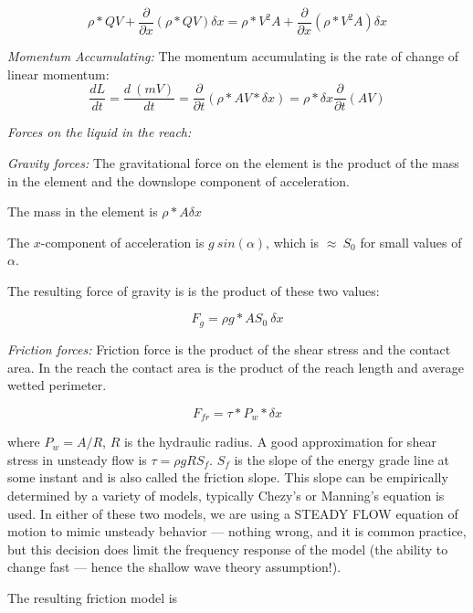 \begin{equation}
\rho*QV+\frac{\partial}{\partial x}(\rho*QV)\delta x = \rho*V^2A+\frac{\partial}{\partial x}(\rho*V^2A)\delta x
\end{equation}

\textsl{Momentum Accumulating:}
The momentum accumulating is the rate of change of linear momentum:
\begin{equation}
\frac{dL}{dt}= \frac{d~(mV)}{dt}=\frac{\partial}{\partial t}(\rho*AV*\delta x)=\rho*\delta x\frac{\partial}{\partial t}(AV)
\end{equation}


\textsl{Forces on the liquid in the reach:}

\textsl{Gravity forces:}  The gravitational force on the element is the product of the mass in the element and the downslope component of acceleration.

The mass in the element is $\rho*A\delta x$ 

The $x$-component of acceleration is $g~sin(\alpha)$, which is $\approx~S_0$ for small values of $\alpha$.

The resulting force of gravity is is the product of these two values:

\begin{equation}
F_g=\rho g *AS_0~\delta x
\end{equation}



\textsl{Friction forces:}   Friction force is the product of the shear stress and the contact area.  In the reach the contact area is the product of the reach length and average wetted perimeter.  

\begin{equation}
F_{fr} = \tau * P_w * \delta x
\end{equation}

where $P_w = A/R$, $R$ is the hydraulic radius.  A good approximation for shear stress in unsteady flow is $\tau = \rho g R S_f$.  $S_f$ is the slope of the energy grade line at some instant and is also called the friction slope.  This slope can be empirically determined by a variety of models, typically Chezy's or Manning's equation is used.  In either of these two models, we are using a STEADY FLOW equation of motion to mimic unsteady behavior --- nothing wrong, and it is common practice, but this decision does limit the frequency response of the model (the ability to change fast --- hence the shallow wave theory assumption!).

The resulting friction model is

